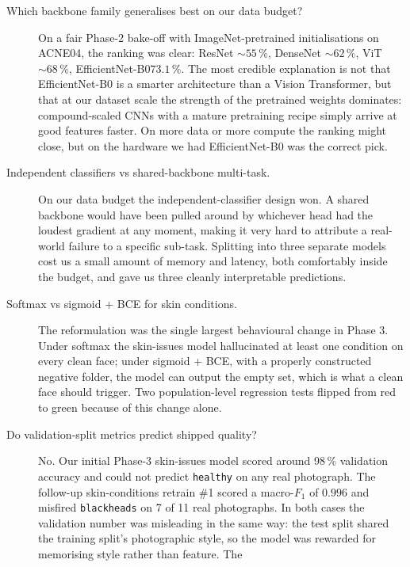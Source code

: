 \documentclass[11pt,a4paper,oneside]{report}
\newcommand{\effnet}{EfficientNet-B0\xspace}
\begin{document}
\begin{description}
    \item[Which backbone family generalises best on our data budget?]
        On a fair Phase-2 bake-off with ImageNet-pretrained
        initialisations on ACNE04, the ranking was clear: ResNet
        \(\sim 55\,\%\), DenseNet \(\sim 62\,\%\), ViT
        \(\sim 68\,\%\), \effnet \(73.1\,\%\). The most
        credible explanation is not that \effnet is a smarter
        architecture than a Vision Transformer, but that at our
        dataset scale the strength of the pretrained weights
        dominates: compound-scaled CNNs with a mature pretraining
        recipe simply arrive at good features faster. On more data
        or more compute the ranking might close, but on the
        hardware we had \effnet was the correct pick.
    \item[Independent classifiers vs shared-backbone multi-task.]
        On our data budget the independent-classifier design won.
        A shared backbone would have been pulled around by
        whichever head had the loudest gradient at any moment,
        making it very hard to attribute a real-world failure to
        a specific sub-task. Splitting into three separate models
        cost us a small amount of memory and latency, both
        comfortably inside the budget, and gave us three cleanly
        interpretable predictions.
    \item[Softmax vs sigmoid + BCE for skin conditions.] The
        reformulation was the single largest behavioural change
        in Phase 3. Under softmax the skin-issues model
        hallucinated at least one condition on every clean face;
        under sigmoid + BCE, with a properly constructed negative
        folder, the model can output the empty set, which is what
        a clean face should trigger. Two population-level
        regression tests flipped from red to green because of
        this change alone.
    \item[Do validation-split metrics predict shipped quality?]
        No. Our initial Phase-3 skin-issues model scored around
        98\,\% validation accuracy and could not predict
        \texttt{healthy} on any real photograph. The follow-up
        skin-conditions retrain \#1 scored a macro-\(F_1\) of
        \(0.996\) and misfired \texttt{blackheads} on 7 of 11
        real photographs. In both cases the validation number was
        misleading in the same way: the test split shared the
        training split's photographic style, so the model was
        rewarded for memorising style rather than feature. The

\end{description}
\end{document}
